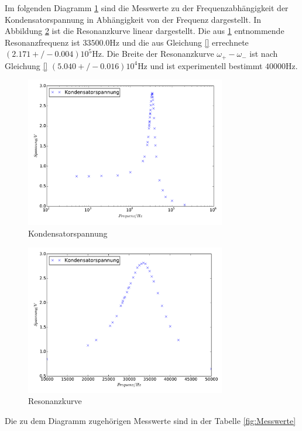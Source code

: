 Im folgenden Diagramm \ref{fig:Kondensatorspannung} sind die
Messwerte zu der Frequenzabhängigkeit der Kondensatorspannung in Abhängigkeit
von der Frequenz dargestellt. In Abbildung \ref{fig:Resonanzkurve} ist die
Resonanzkurve linear dargestellt. Die aus \ref{fig:Kondensatorspannung}
entnommende Resonanzfrequenz ist $  33500.0\si{\hertz}$ und die aus Gleichung
\eqref{} errechnete $(2.171+/-0.004)10^5\si{\hertz}$. Die Breite der
Resonanzkurve $\omega_+-\omega_- $ ist nach Gleichung \eqref{}
$ (5.040+/-0.016)10^4\si{\hertz}$ und ist experimentell bestimmt $ 40000\si{\hertz}$.
\begin{figure}
  \centering
  \includegraphics[width=0.78\textwidth]{Kondensatorspannung.pdf}
  \caption{Kondensatorspannung}
  \label{fig:Kondensatorspannung}
\end{figure}
\begin{figure}
  \centering
  \includegraphics[width=0.78\textwidth]{Resonanzkurve.pdf}
  \caption{Resonanzkurve}
  \label{fig:Resonanzkurve}
\end{figure}
Die zu dem Diagramm zugehörigen Messwerte sind in der Tabelle \ref{fig:Messwerte}

